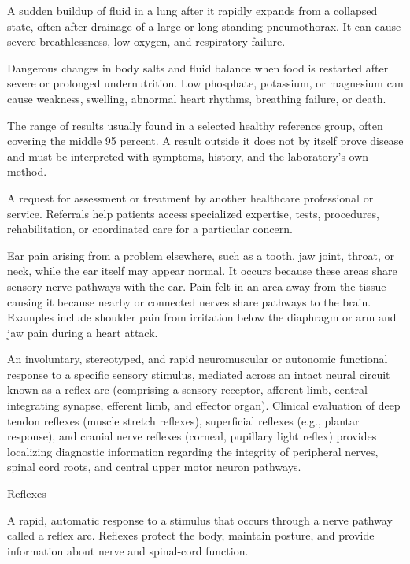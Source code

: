  A sudden buildup of fluid in a lung after it rapidly expands from a collapsed state, often after drainage of a large or long-standing pneumothorax. It can cause severe breathlessness, low oxygen, and respiratory failure.

 Dangerous changes in body salts and fluid balance when food is restarted after severe or prolonged undernutrition. Low phosphate, potassium, or magnesium can cause weakness, swelling, abnormal heart rhythms, breathing failure, or death.

 The range of results usually found in a selected healthy reference group, often covering the middle 95 percent. A result outside it does not by itself prove disease and must be interpreted with symptoms, history, and the laboratory’s own method.

 A request for assessment or treatment by another healthcare professional or service. Referrals help patients access specialized expertise, tests, procedures, rehabilitation, or coordinated care for a particular concern.

 Ear pain arising from a problem elsewhere, such as a tooth, jaw joint, throat, or neck, while the ear itself may appear normal. It occurs because these areas share sensory nerve pathways with the ear.
 Pain felt in an area away from the tissue causing it because nearby or connected nerves share pathways to the brain. Examples include shoulder pain from irritation below the diaphragm or arm and jaw pain during a heart attack.

 An involuntary, stereotyped, and rapid neuromuscular or autonomic functional response to a specific sensory stimulus, mediated across an intact neural circuit known as a reflex arc (comprising a sensory receptor, afferent limb, central integrating synapse, efferent limb, and effector organ). Clinical evaluation of deep tendon reflexes (muscle stretch reflexes), superficial reflexes (e.g., plantar response), and cranial nerve reflexes (corneal, pupillary light reflex) provides localizing diagnostic information regarding the integrity of peripheral nerves, spinal cord roots, and central upper motor neuron pathways.

\synonyms
Reflexes

 A rapid, automatic response to a stimulus that occurs through a nerve pathway called a reflex arc. Reflexes protect the body, maintain posture, and provide information about nerve and spinal-cord function.

